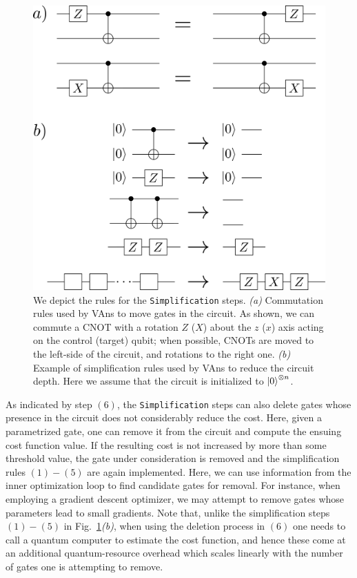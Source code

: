 \begin{figure}[t!]
\centering
\includegraphics[width=.7\textwidth]{Figures/VANS/Fig4.pdf}
\caption{We depict the rules for the \texttt{Simplification} steps. \textit{(a)} Commutation rules used by VAns to move gates in the circuit. As shown, we can commute a CNOT with a rotation $Z$ ($X$) about the $z$ ($x$) axis acting on the control (target) qubit; when possible, CNOTs are moved to the left-side of the circuit, and rotations to the right one. \textit{(b)} Example of simplification rules used by VAns to reduce the circuit depth. Here we assume that the circuit is initialized to $\ket{0}^{\otimes n}$. }
\label{fig:simplification}
\end{figure}

As indicated by step $(6)$, the \texttt{Simplification} steps can also delete gates whose presence in the circuit does not considerably reduce the cost. Here, given a parametrized gate, one can remove it from the circuit and compute the ensuing cost function value. If the resulting cost is not increased by more than some threshold value, the gate under consideration is removed and the simplification rules $(1)-(5)$ are again implemented. Here, we can use information from the inner optimization loop to find candidate gates for removal. For instance, when employing a gradient descent optimizer, we may attempt to remove gates whose parameters lead to small gradients. Note that, unlike the simplification steps $(1)-(5)$ in Fig.~\ref{fig:simplification}\textit{(b)}, when using the deletion process in $(6)$ one needs to call a quantum computer to estimate the cost function, and hence these come at an additional quantum-resource overhead which scales linearly with the number of gates one is attempting to remove.

